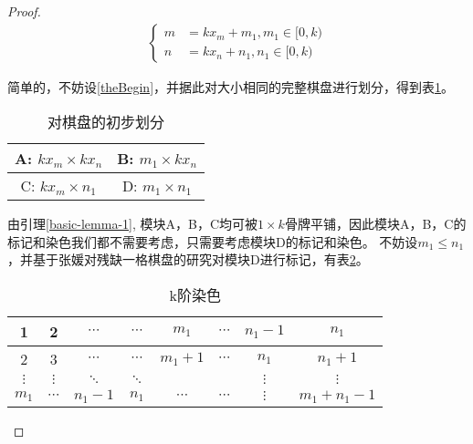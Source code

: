 \begin{proof}
    \begin{align}
        \left\{
        \begin{aligned}
            m & =  kx_m + m_1, m_1 \in [0, k) \\
            n & =  kx_n + n_1, n_1 \in [0, k)
        \end{aligned}
        \right.
        \label{theBegin}
    \end{align}

    简单的，不妨设\ref{theBegin}，并据此对大小相同的完整棋盘进行划分，得到表\ref{fig:first-picture}。

    \begin{table}[h]
        \centering
        \caption{对棋盘的初步划分}
        \begin{tabular}{|c|c|}
            \hline
            A: $kx_m \times kx_n$ & B: $m_1 \times kx_n$ \\
            \hline
            C: $kx_m \times n_1$  & D: $m_1 \times n_1$  \\
            \hline
        \end{tabular}
        \label{fig:first-picture}
    \end{table}

    由引理\ref{basic-lemma-1}, 模块A，B，C均可被$1 \times k$骨牌平铺，因此模块A，B，C的标记和染色我们都不需要考虑，只需要考虑模块D的标记和染色\cite{fengBasicTheorem}。
    不妨设$m_1 \le n_1$，并基于张媛对残缺一格棋盘的研究\cite{zhangOneStain}对模块D进行标记，有表\ref{fig:k-order-staining-example}。

    \begin{table}[ht]
        \centering
        \caption{k阶染色}
        \begin{tabular}{|c|c|c|c|c|c|c|c|}
            \hline
            1        & 2        & $\cdots$ & $\cdots$ & $m_1$     & $\cdots$ & $n_1 - 1$ & $n_1$           \\
            \hline
            2        & 3        & $\cdots$ & $\cdots$ & $m_1 + 1$ & $\cdots$ & $n_1$     & $n_1 + 1$       \\
            \hline
            $\vdots$ & $\vdots$ & $\ddots$ & $\ddots$ &           &          & $\vdots$  & $\vdots$        \\
            \hline
            $m_1$    & $\cdots$ & $n_1-1$  & $n_1$    & $\cdots$  & $\cdots$ & $\vdots$  & $m_1 + n_1 - 1$ \\
            \hline
        \end{tabular}
        \label{fig:k-order-staining-example}
    \end{table}


\end{proof}
